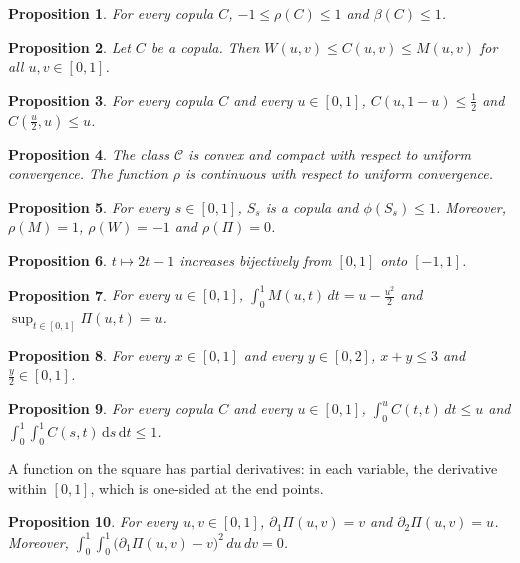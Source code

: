 \documentclass{article}
\newtheorem{proposition}{Proposition}
\newcommand{\CC}{\mathcal{C}}
\begin{document}
\begin{proposition}\label{p2}
For every copula $C$, $-1\le\rho(C)\le 1$ and $\beta(C)\le 1$.
\end{proposition}

\begin{proposition}\label{p3}
Let $C$ be a copula. Then $W(u,v)\le C(u,v)\le M(u,v)$ for all $u,v\in[0,1]$.
\end{proposition}

\begin{proposition}\label{p4}
For every copula $C$ and every $u\in[0,1]$, $C(u,1-u)\le\frac12$ and $C(\frac u2,u)\le u$.
\end{proposition}

\begin{proposition}\label{p5}
The class $\CC$ is convex and compact with respect to uniform convergence. The function $\rho$ is continuous with respect to uniform convergence.
\end{proposition}

\begin{proposition}\label{p6}
For every $s\in[0,1]$, $S_s$ is a copula and $\phi(S_s)\le 1$. Moreover, $\rho(M)=1$, $\rho(W)=-1$ and $\rho(\Pi)=0$.
\end{proposition}

\begin{proposition}\label{p7}
$t\mapsto2t-1$ increases bijectively from $[0,1]$ onto $[-1,1]$.
\end{proposition}

\begin{proposition}\label{p8}
For every $u\in[0,1]$, $\int_0^1 M(u,t)\,dt=u-\frac{u^2}{2}$ and $\sup_{t\in[0,1]}\Pi(u,t)=u$.
\end{proposition}

\begin{proposition}\label{p9}
For every $x\in[0,1]$ and every $y\in[0,2]$, $x+y\le 3$ and $\frac{y}{2}\in[0,1]$.
\end{proposition}

\begin{proposition}\label{p10}
For every copula $C$ and every $u\in[0,1]$, $\int_0^u C(t,t)\,dt\le u$ and $\int_0^1\int_0^1 C(s,t)\,\mathrm{d}s\,\mathrm{d}t\le 1$.
\end{proposition}

A function on the square has partial derivatives: in each variable, the derivative within $[0,1]$, which is one-sided at the end points.

\begin{proposition}\label{p11}
For every $u,v\in[0,1]$, $\partial_1\Pi(u,v)=v$ and $\partial_2\Pi(u,v)=u$.
Moreover, $\int_0^1\int_0^1\bigl(\partial_1\Pi(u,v)-v\bigr)^2\,du\,dv=0$.
\end{proposition}
\end{document}
